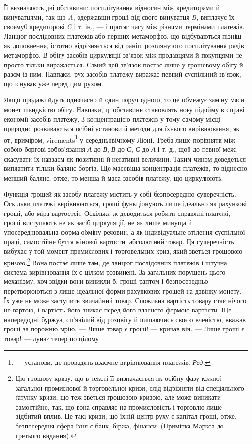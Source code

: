 \parcont{}  %
Її визначають дві обставини: посплітування відносин між кредиторами й винуватцями,
так що \emph{A}, одержавши гроші від свого винуватця \emph{B}, виплачує їх своєму0
кредиторові \emph{C} і т. ін., — і протяг часу між різними термінами платежів.
Ланцюг послідовних платежів або перших метаморфоз, що відбуваються
пізніш як доповнення, істотно відрізняється від раніш розглянутого посплітування
рядів метаморфоз. В обігу засобів циркуляції зв’язок між продавцями й покупцями
не просто тільки виражається. Самий цей зв’язок постає лише у грошовому обігу й
разом із ним. Навпаки, рух засобів платежу виражає певний
суспільний зв’язок, що існував уже перед цим рухом.

Якщо продажі йдуть одночасно й один поруч одного, то це обмежує заміну маси монет
швидкістю обігу. Навпаки, ці обставини становлять нову підойму в справі економії
засобів платежу. З концентрацією платежів у тому самому місці природно
розвиваються осібні установи й методи для їхнього
вирівнювання, як от, приміром, virements\footnote*{
— установи, де провадять взаємне вирівнювання платежів. \emph{Ред.}
} у середньовічному Ліоні. Треба лише порівняти між собою
боргові зобов’язання \emph{А} до \emph{В}, \emph{В} до \emph{С}, \emph{С} до
\emph{А} і т. д., щоб до певної межі скасувати їх навзаєм як
позитивні й неґативні величини. Таким чином доведеться виплатити тільки балянс
боргів. Що масовіша концентрація платежів, то відносно менший балянс, отже, то
менша й маса засобів платежу, що циркулюють.

Функція грошей як засобу платежу містить у собі безпосередню суперечність.
Оскільки платежі вирівнюються, гроші функціонують лише ідеально як рахункові
гроші, або міра вартостей. Оскільки ж
доводиться робити справжні платежі, гроші
виступають не як засіб циркуляції, не як лише минуща й упосереднювальна форма
обміну речовин, а як індивідуальне втілення суспільної праці, самостійне буття
мінової вартости, абсолютний товар. Ця суперечність вибухає у той момент
промислових і торговельних криз, який зветься грошовою кризою.\footnote{
Цю грошову кризу, що в тексті її визначається як осібну фазу кожної загальної
промислової й торговельної кризи, слід відрізняти від спеціяльного ґатунку
кризи, що теж зветься грошовою кризою, але може виникати самостійно, так, що
вона справляє на промисловість і торговлю лише відбитий вплив.
Це такі кризи, що їхній центр руху є капітал-гроші, отже, безпосередня сфера
їхня є банк, біржа, фінанси. (Примітка Маркса до третього видання).
}
Вона постає лише там, де ланцюг послідовних платежів і штучна система
вирівнювання їх є цілком розвинені. За загальних порушень цього механізму,
хоч звідки вони виникли б, гроші раптом і безпосередньо перетворюються з лише
ідеальної форми рахункових грошей на дзвінку монету. Їх уже не може заступити
звичайний товар. Споживна вартість товару стає нічого не вартою, і вартість його
зникає перед його власного формою вартости. Ще напередодні буржуа, сп’янілий
від розцвіту й пишаючись своєю вченістю, вважав гроші за порожню мрію. — Лише
товар є гроші! — кричав він. — Лише гроші є товар! — лунає тепер по цілому
\parbreak{}  %
